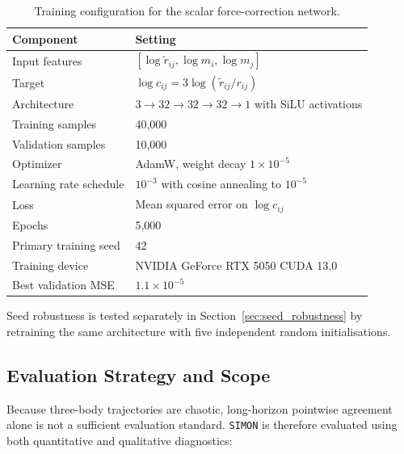 \documentclass[12pt]{article}
\begin{document}
\begin{table}[H]
\centering
\caption{Training configuration for the scalar force-correction network.}
\label{tab:training_config}
\begin{tabular}{@{}ll@{}}
\toprule
\textbf{Component} & \textbf{Setting} \\
\midrule
Input features & $[\log \tilde r_{ij},\log m_i,\log m_j]$ \\
Target & $\log c_{ij}=3\log(\tilde r_{ij}/r_{ij})$ \\
Architecture & $3\rightarrow32\rightarrow32\rightarrow32\rightarrow1$ with SiLU activations \\
Training samples & 40,000 \\
Validation samples & 10,000 \\
Optimizer & AdamW, weight decay $1\times10^{-5}$ \\
Learning rate schedule & $10^{-3}$ with cosine annealing to $10^{-5}$ \cite{loshchilov2017sgdr} \\
Loss & Mean squared error on $\log c_{ij}$ \\
Epochs & 5,000 \\
Primary training seed & 42 \\
Training device & NVIDIA GeForce RTX 5050 CUDA 13.0 \\
Best validation MSE & $1.1\times10^{-5}$ \\
\bottomrule
\end{tabular}
\end{table}

Seed robustness is tested separately in Section~\ref{sec:seed_robustness} by retraining the
same architecture with five independent random initialisations.

\subsection{Evaluation Strategy and Scope}
\label{sec:evaluation}

Because three-body trajectories are chaotic, long-horizon pointwise agreement alone is not
a sufficient evaluation standard. \texttt{SIMON} is therefore evaluated using both quantitative
and qualitative diagnostics:
\end{document}
